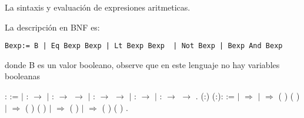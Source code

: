 \documentclass[12pt]{report}
\begin{document}
La sintaxis y evaluación de expresiones aritmeticas.


La descripción en BNF es:
\begin{verbatim}
Bexp:= B | Eq Bexp Bexp | Lt Bexp Bexp  | Not Bexp | Bexp And Bexp
\end{verbatim}


donde B es un valor booleano, observe que en este lenguaje no hay variables booleanas


\begin{coqdoccode}
\coqdocemptyline
\coqdocnoindent
{} :  :=\coqdoceol
\coqdocnoindent
\ensuremath{|}  :  \ensuremath{\rightarrow} \coqdoceol
\coqdocnoindent
\ensuremath{|}  :  \ensuremath{\rightarrow}  \ensuremath{\rightarrow} \coqdoceol
\coqdocnoindent
\ensuremath{|}  :  \ensuremath{\rightarrow}  \ensuremath{\rightarrow} \coqdoceol
\coqdocnoindent
\ensuremath{|}  :  \ensuremath{\rightarrow} \coqdoceol
\coqdocnoindent
\ensuremath{|}  :  \ensuremath{\rightarrow}  \ensuremath{\rightarrow} .\coqdoceol
\coqdocemptyline
\coqdocnoindent
{}  (:) (:): :=\coqdoceol
\coqdocnoindent
{}  \coqdoceol
\coqdocnoindent
\ensuremath{|}   \ensuremath{\Rightarrow}   \coqdoceol
\coqdocnoindent
\ensuremath{|}    \ensuremath{\Rightarrow}  (  ) (  )\coqdoceol
\coqdocnoindent
\ensuremath{|}    \ensuremath{\Rightarrow}  (  ) (  )\coqdoceol
\coqdocnoindent
\ensuremath{|}   \ensuremath{\Rightarrow}  (  )\coqdoceol
\coqdocnoindent
\ensuremath{|}    \ensuremath{\Rightarrow}  (  ) (  )\coqdoceol
\coqdocnoindent
{}.\coqdoceol
\coqdocemptyline
\end{coqdoccode}
\end{document}
